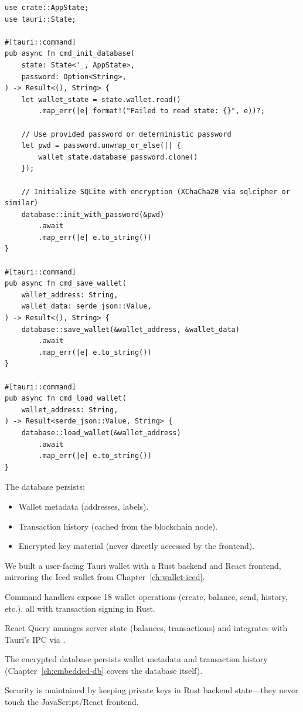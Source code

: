 \begin{listing}[htbp]
\caption{Database initialization command ()}
\label{lst:ch19-db-cmd}
\begin{verbatim}
use crate::AppState;
use tauri::State;

#[tauri::command]
pub async fn cmd_init_database(
    state: State<'_, AppState>,
    password: Option<String>,
) -> Result<(), String> {
    let wallet_state = state.wallet.read()
        .map_err(|e| format!("Failed to read state: {}", e))?;

    // Use provided password or deterministic password
    let pwd = password.unwrap_or_else(|| {
        wallet_state.database_password.clone()
    });

    // Initialize SQLite with encryption (XChaCha20 via sqlcipher or similar)
    database::init_with_password(&pwd)
        .await
        .map_err(|e| e.to_string())
}

#[tauri::command]
pub async fn cmd_save_wallet(
    wallet_address: String,
    wallet_data: serde_json::Value,
) -> Result<(), String> {
    database::save_wallet(&wallet_address, &wallet_data)
        .await
        .map_err(|e| e.to_string())
}

#[tauri::command]
pub async fn cmd_load_wallet(
    wallet_address: String,
) -> Result<serde_json::Value, String> {
    database::load_wallet(&wallet_address)
        .await
        .map_err(|e| e.to_string())
}
\end{verbatim}
\end{listing}

The database persists:
\begin{itemize}
  \item Wallet metadata (addresses, labels).
  \item Transaction history (cached from the blockchain node).
  \item Encrypted key material (never directly accessed by the frontend).
\end{itemize}

\begin{chaptersummary}
\item We built a user-facing Tauri wallet with a Rust backend and React frontend, mirroring the Iced wallet from Chapter~\ref{ch:wallet-iced}.
\item Command handlers expose 18 wallet operations (create, balance, send, history, etc.), all with transaction signing in Rust.
\item React Query manages server state (balances, transactions) and integrates with Tauri's IPC via .
\item The encrypted database persists wallet metadata and transaction history (Chapter~\ref{ch:embedded-db} covers the database itself).
\item Security is maintained by keeping private keys in Rust backend state---they never touch the JavaScript/React frontend.
\end{chaptersummary}

